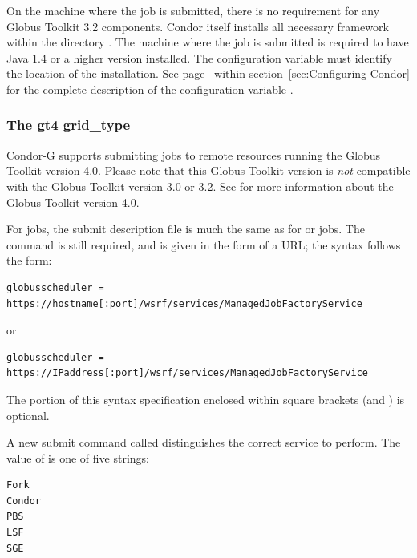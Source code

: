 
On the machine where the job is submitted,
there is no requirement for any Globus Toolkit 3.2 components.
Condor itself installs all necessary framework within the directory 
.
The machine where the job is submitted
is required to
have Java 1.4 or a higher version installed.
The configuration variable 
must identify the location of the installation.
See page~\pageref{param:Java} within
section~\ref{sec:Configuring-Condor}
for the complete description of the configuration variable .


\subsubsection{\label{sec:Using-gt4}The gt4 grid\_type}

Condor-G supports submitting jobs to remote resources running
the Globus Toolkit version 4.0.
Please note that this Globus Toolkit version
is \emph{not} compatible with the Globus Toolkit version 3.0 or 3.2.
See
for more information about the Globus Toolkit version 4.0.

For   jobs,
the submit description file is much the same as for
  or  jobs.
The  command is still required,
and is given in the form of a URL; the syntax follows the form:
\footnotesize
\begin{verbatim}
globusscheduler = https://hostname[:port]/wsrf/services/ManagedJobFactoryService
\end{verbatim}
\normalsize

or
\footnotesize
\begin{verbatim}
globusscheduler = https://IPaddress[:port]/wsrf/services/ManagedJobFactoryService
\end{verbatim}
\normalsize
The portion of this syntax specification enclosed within
square brackets (\Lbr and \Rbr) is optional.

A new submit command called 
distinguishes the correct service to perform.
The value of  is one of five
strings:
\begin{verbatim}
Fork
Condor
PBS
LSF
SGE
\end{verbatim}

